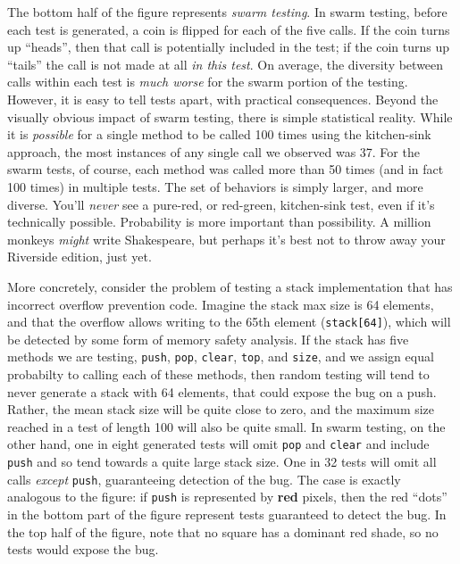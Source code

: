 \documentclass[sigplan,review]{acmart}
\begin{document}
The bottom half of the figure represents \emph{swarm testing}.  In
swarm testing, before each test is generated, a coin is flipped for
each of the five calls.  If the coin turns up ``heads'', then that
call is potentially included in the test; if the coin turns up
``tails'' the call is not made at all \emph{in this test}.  On
average, the diversity between calls within each test is \emph{much
  worse} for the swarm portion of the testing.  However, it is easy to
tell tests apart, with practical consequences.  Beyond the visually
obvious impact of swarm testing, there is simple statistical reality.
While it is \emph{possible} for a single method to be called 100 times
using the kitchen-sink approach, the most instances of any single call
we observed was 37.  For the swarm tests, of course, each method was
called more than 50 times (and in fact 100 times) in multiple tests.
The set of behaviors is simply larger, and more diverse.  You'll \emph{never}
see a pure-red, or red-green, kitchen-sink test, even if it's
technically possible.  Probability is more important than
possibility.  A million monkeys \emph{might} write Shakespeare, but
perhaps it's best not to throw away your Riverside edition, just yet.

More concretely, consider the problem of testing a stack
implementation that has incorrect overflow prevention code.  Imagine
the stack max size is 64 elements, and that the overflow allows
writing to the 65th element ({\tt stack[64]}), which will be detected by some form of
memory safety analysis.  If the stack has five methods we are testing,
{\tt push}, {\tt pop}, {\tt clear}, {\tt top}, and {\tt size}, and we
assign equal probabilty to calling each of these methods, then random
testing will tend to never generate a stack with 64 elements, that
could expose the bug on a push.  Rather, the mean stack size will be
quite close to zero, and the maximum size reached in a test of length
100 will also be quite small.  In swarm testing, on the other hand,
one in eight generated tests will omit {\tt pop} and {\tt clear} and
include {\tt push} and so tend towards a quite large stack size.  One
in 32 tests will omit all calls \emph{except} {\tt push}, guaranteeing
detection of the bug.  The case is exactly analogous to the figure: if
{\tt push} is represented by {\bf red} pixels, then the red ``dots''
in the bottom part of the figure represent tests guaranteed to detect
the bug.  In the top half of the figure, note that no square has a
dominant red shade, so no tests would expose the bug.
\end{document}
